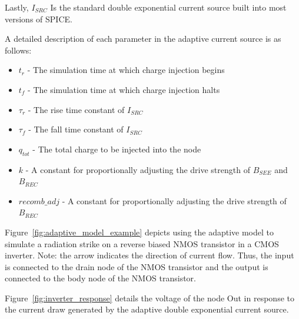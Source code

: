 \documentclass[conference]{IEEEtran}
\begin{document}
    Lastly, \(I_{SRC}\) Is the standard double exponential current source built into most versions of SPICE\@.

    A detailed description of each parameter in the adaptive current source is as follows:

    \begin{itemize}

        \item[] \(t_r\) - The simulation time at which charge injection begins

        \item[] \(t_f\) - The simulation time at which charge injection halts

        \item[] \(\tau_r\) - The rise time constant of \(I_{SRC}\)

        \item[] \(\tau_f\) - The fall time constant of \(I_{SRC}\)

        \item[] \(q_{tot}\) - The total charge to be injected into the node

        \item[] \(k\) - A constant for proportionally adjusting the drive strength of \(B_{SEE}\) and \(B_{REC}\)

        \item[] \(recomb\_adj\) - A constant for proportionally adjusting the drive strength of \(B_{REC}\)

    \end{itemize}
    \vspace{1em}

    Figure~\ref{fig:adaptive_model_example} depicts using the adaptive model to simulate a radiation strike on a reverse biased NMOS transistor in a CMOS inverter.
    Note: the arrow indicates the direction of current flow.
    Thus, the input is connected to the drain node of the NMOS transistor and the output is connected to the body node of the NMOS transistor.

    Figure~\ref{fig:inverter_response} details the voltage of the node Out in response to the current draw generated by the adaptive double exponential current source.
\end{document}
